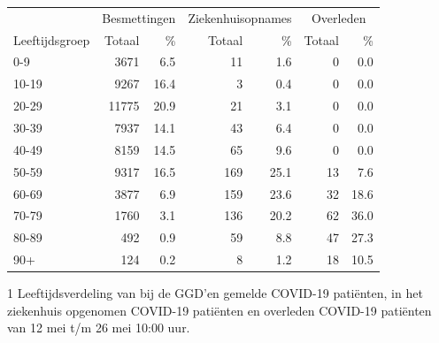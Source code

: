 \documentclass[
  english,
  man,floatsintext]{apa6}
\begin{document}
\begin{table}
\centering\begingroup\fontsize{11}{13}\selectfont

\begin{threeparttable}
\begin{tabular}{lrrrrrr}
\toprule
\multicolumn{1}{c}{ } & \multicolumn{2}{c}{Besmettingen} & \multicolumn{2}{c}{Ziekenhuisopnames} & \multicolumn{2}{c}{Overleden} \\
\cmidrule(l{3pt}r{3pt}){2-3} \cmidrule(l{3pt}r{3pt}){4-5} \cmidrule(l{3pt}r{3pt}){6-7}
Leeftijdsgroep & Totaal & \% & Totaal & \% & Totaal & \%\\
\midrule
0-9 & 3671 & 6.5 & 11 & 1.6 & 0 & 0.0\\
10-19 & 9267 & 16.4 & 3 & 0.4 & 0 & 0.0\\
20-29 & 11775 & 20.9 & 21 & 3.1 & 0 & 0.0\\
30-39 & 7937 & 14.1 & 43 & 6.4 & 0 & 0.0\\
40-49 & 8159 & 14.5 & 65 & 9.6 & 0 & 0.0\\
50-59 & 9317 & 16.5 & 169 & 25.1 & 13 & 7.6\\
60-69 & 3877 & 6.9 & 159 & 23.6 & 32 & 18.6\\
70-79 & 1760 & 3.1 & 136 & 20.2 & 62 & 36.0\\
80-89 & 492 & 0.9 & 59 & 8.8 & 47 & 27.3\\
90+ & 124 & 0.2 & 8 & 1.2 & 18 & 10.5\\
\bottomrule
\end{tabular}
\begin{tablenotes}
\item[1] Leeftijdsverdeling van bij de GGD’en gemelde COVID-19 patiënten, in het ziekenhuis opgenomen COVID-19 patiënten en overleden COVID-19 patiënten van 12 mei t/m 26 mei 10:00 uur.
\end{tablenotes}
\end{threeparttable}
\endgroup{}
\end{table}

\newpage
\end{document}
